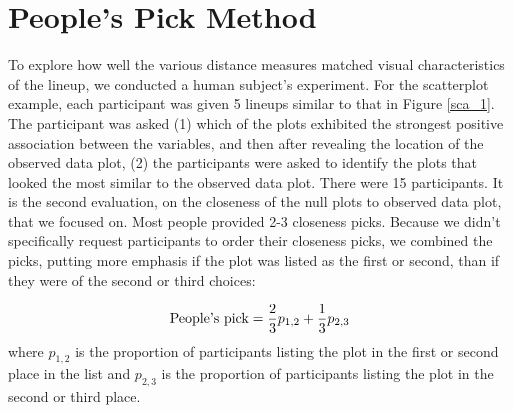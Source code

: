 \section{People's Pick Method}\label{user.distance}

To explore how well the various distance measures matched visual characteristics of the lineup,  we conducted a human subject's experiment. For the scatterplot example, each participant was given 5 lineups similar to that in Figure \ref{sca_1}. The participant was asked (1) which of the plots exhibited the strongest positive association between the variables, and then after revealing the location of the observed data plot,  (2) the participants were asked to identify the plots that looked the most similar to the observed data plot. There were 15 participants.  It is the second evaluation, on the closeness of the null plots to observed data plot, that we focused on. Most people provided 2-3 closeness picks.  Because we didn't specifically request participants to order their closeness picks, we combined the picks, putting more emphasis if the plot was listed as the first or second, than if they were of the second or third choices:





\[
\hbox{People's pick} = \frac{2}{3} p_{1,2} + \frac{1}{3} p_{2,3}
\]
where $p_{1,2}$ is the proportion of participants listing the plot  in the first or second place in the list and $p_{2,3}$ is the proportion of participants listing the plot in the second or third place.

